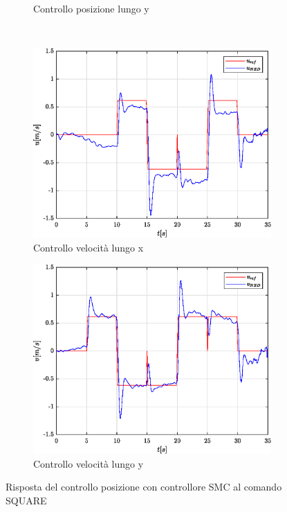 \begin{figure}
\begin{subfigure}{0.45\textwidth}
		\caption{Controllo posizione lungo y}
		\label{fig:SQUAREerrposySMC}
	\end{subfigure}
	\\
	\begin{subfigure}{0.45\textwidth}
		\centering
		\includegraphics[width=1\textwidth]{Simulazioni/Figure/SMC/SQUARE/PositionControlXVel}
		\caption{Controllo velocità lungo x}
		\label{fig:SQUAREerrvelxSMC}
	\end{subfigure}
	\hfill
	\begin{subfigure}{0.45\textwidth}
		\centering
		\includegraphics[width=1\textwidth]{Simulazioni/Figure/SMC/SQUARE/PositionControlYVel}
		\caption{Controllo velocità lungo y}
		\label{fig:SQUAREerrvelySMC}
	\end{subfigure}
	\caption{Risposta del controllo posizione con controllore SMC al comando SQUARE}
\end{figure}

